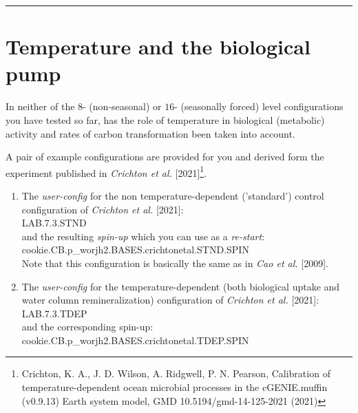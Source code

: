 \vspace{1mm} \noindent\rule{4cm}{0.5pt} \vspace{2mm}

\newpage

\section{Temperature and the biological pump}

In neither of the $8$- (non-seasonal) or $16$- (seasonally forced) level configurations you have tested so far, has the role of temperature in biological (metabolic) activity and rates of carbon transformation been taken into account.

\vspace{1mm}
A pair of example configurations are provided for you and derived form the experiment published in \textit{Crichton et al.} [2021]\footnote{Crichton, K. A., J. D. Wilson, A. Ridgwell, P. N. Pearson, Calibration of temperature-dependent ocean microbial processes in the cGENIE.muffin (v0.9.13) Earth system model, GMD 10.5194/gmd-14-125-2021 (2021)}. 

\begin{enumerate}[noitemsep]
\vspace{1mm}
\item The \textit{user-config} for the non temperature-dependent ('standard') control configuration of \textit{Crichton et al.} [2021]:
\\\textsf{\footnotesize LAB.7.3.STND} 
\\and the resulting \textit{spin-up} which you can use as a \textit{re-start}: 
\\\textsf{\footnotesize cookie.CB.p\_worjh2.BASES.crichtonetal.STND.SPIN}
\\Note that this configuration is basically the same as in \textit{Cao et al.} [2009].
\vspace{1mm}
\item The \textit{user-config} for the temperature-dependent (both biological uptake and water column remineralization) configuration of \textit{Crichton et al.} [2021]:
\\\textsf{\footnotesize LAB.7.3.TDEP} 
\\and the corresponding spin-up: 
\\\textsf{\footnotesize cookie.CB.p\_worjh2.BASES.crichtonetal.TDEP.SPIN}
\end{enumerate}

